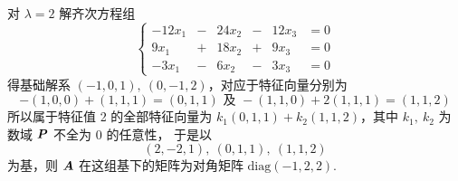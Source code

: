 \begin{solution}
    对 $\lambda=2$ 解齐次方程组
    $$\left\{\begin{matrix}
            -12x_1 & - & 24x_2 & - & 12x_3 & =0 \\
            9x_1   & + & 18x_2 & + & 9x_3  & =0 \\
            -3x_1  & - & 6x_2  & - & 3x_3  & =0
        \end{matrix}\right.$$
        得基础解系 $(-1,0,1),~(0,-1,2)$，对应于特征向量分别为
        $$-(1,0,0)+(1,1,1)=(0,1,1)\text{ 及 }-(1,1,0)+2(1,1,1)=(1,1,2)$$
        所以属于特征值 2 的全部特征向量为 $k_1(0,1,1)+k_2(1,1,2)$，其中 $k_1,~k_2$ 为数域 $\vb*{P}$ 不全为 0 的任意性，
        于是以 $$(2,-2,1),~(0,1,1),~(1,1,2)$$ 为基，则 $\vb*{A}$ 在这组基下的矩阵为对角矩阵 $\mathrm{diag}(-1,2,2).$
\end{solution}

